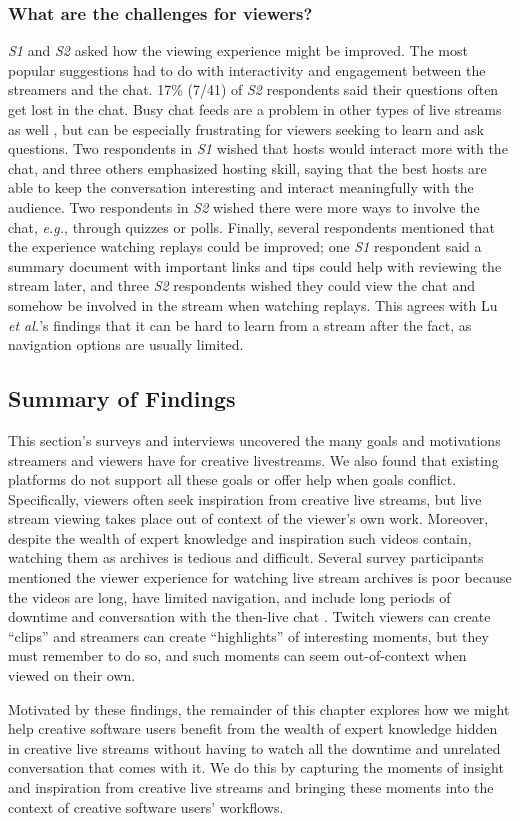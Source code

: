 \subsubsection{What are the challenges for viewers?}
\textit{S1} and \textit{S2} asked how the viewing experience might be improved. The most popular suggestions had to do with interactivity and engagement between the streamers and the chat. 17\% (7/41) of \textit{S2} respondents said their questions often get lost in the chat. Busy chat feeds are a problem in other types of live streams as well \cite{Miller2017}, but can be especially frustrating for viewers seeking to learn and ask questions. Two respondents in \textit{S1} wished that hosts would interact more with the chat, and three others emphasized hosting skill, saying that the best hosts are able to keep the conversation interesting and interact meaningfully with the audience. Two respondents in \textit{S2} wished there were more ways to involve the chat, \textit{e.g.}, through quizzes or polls. Finally, several respondents mentioned that the experience watching replays could be improved; one \textit{S1} respondent said a summary document with important links and tips could help with reviewing the stream later, and three \textit{S2} respondents wished they could view the chat and somehow be involved in the stream when watching replays. This agrees with Lu \textit{et al.}'s findings \cite{Lu2018} that it can be hard to learn from a stream after the fact, as navigation options are usually limited.

\subsection{Summary of Findings}
This section's surveys and interviews uncovered the many goals and motivations streamers and viewers have for creative live\-streams. We also found that existing platforms do not support all these goals or offer help when goals conflict. Specifically, viewers often seek inspiration from creative live streams, but live stream viewing takes place out of context of the viewer's own work. Moreover, despite the wealth of expert knowledge and inspiration such videos contain, watching them as archives is tedious and difficult. Several survey participants mentioned the viewer experience for watching live stream archives is poor because the videos are long, have limited navigation, and include long periods of downtime and conversation with the then-live chat \cite{Lu2018}. Twitch viewers can create ``clips'' and streamers can create ``highlights'' of interesting moments, but they must remember to do so, and such moments can seem out-of-context when viewed on their own.

Motivated by these findings, the remainder of this chapter explores how we might help creative software users benefit from the wealth of expert knowledge hidden in creative live streams without having to watch all the downtime and unrelated conversation that comes with it. We do this by capturing the moments of insight and inspiration from creative live streams and bringing these moments into the context of creative software users' workflows.